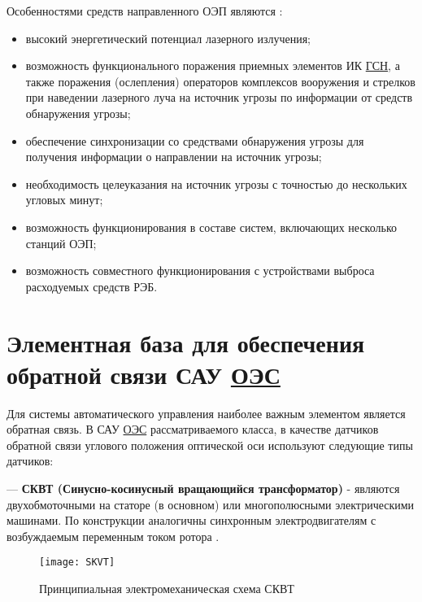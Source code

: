 Особенностями средств направленного ОЭП являются \cite[]{ForeignMilitary}:
\begin{itemize}
	\item высокий энергетический потенциал лазерного излучения;
	\item возможность функционального поражения приемных элементов ИК \hyperref[acroGSN]{ГСН}, а также поражения (ослепления) операторов комплексов вооружения и стрелков при наведении лазерного луча на источник угрозы по информации от средств обнаружения угрозы;
	\item обеспечение синхронизации со средствами обнаружения угрозы для получения информации о направлении на источник угрозы;
	\item необходимость целеуказания на источник угрозы с точностью до нескольких угловых минут;
	\item возможность функционирования в составе систем, включающих несколько станций ОЭП;
	\item возможность совместного функционирования с устройствами выброса расходуемых средств РЭБ.
\end{itemize}



\section{Элементная база для обеспечения обратной связи САУ \hyperref[acroEOS]{ОЭС}} \label{sec:ch1/sec3-}
Для системы автоматического управления наиболее важным элементом является обратная связь. В САУ  \hyperref[acroEOS]{ОЭС} рассматриваемого класса, в качестве датчиков обратной связи углового положения оптической оси используют следующие типы датчиков:

--- \textbf{СКВТ (Синусно-косинусный вращающийся трансформатор)} - являются двухобмоточными на статоре (в основном) или многополюсными электрическими машинами. По конструкции аналогичны синхронным электродвигателям с возбуждаемым переменным током ротора \cite[]{SKVT}. 
	
	\begin{figure}[ht]
		\centering
		\texttt{[image: SKVT]} 
		\caption{Принципиальная электромеханическая схема СКВТ \cite[]{1310HM025}}
		\label{fig:SKVT}
	\end{figure}
	
